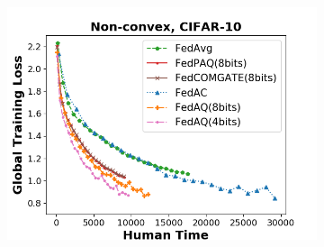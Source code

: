 \begin{figure}[hbt!]
\begin{subfigure}[b]{0.31\textwidth}
    \includegraphics[width=\textwidth]{figure/loss_iid_time_cnn_step100.png}
    \end{subfigure}
    

\end{figure}
